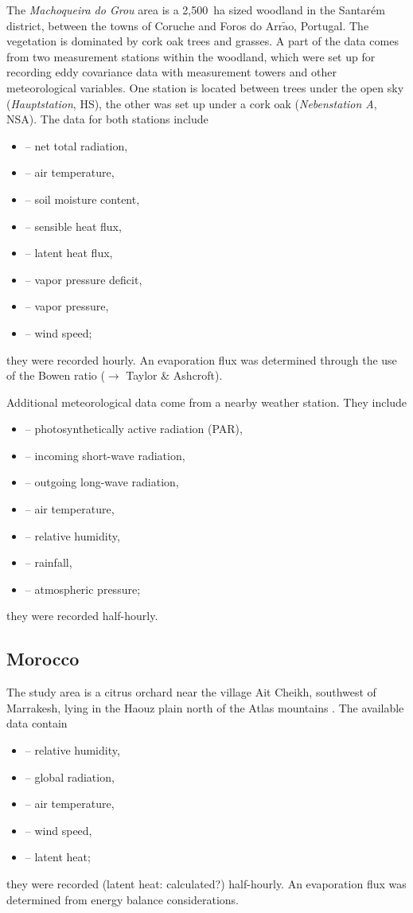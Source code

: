 \documentclass{scrreprt}
\newenvironment{denseitem}{
  \begin{itemize}
    \setlength{\itemsep}{0pt}
    \setlength{\parskip}{0pt}
    \setlength{\parsep}{0pt}
}{
  \end{itemize}
}
\begin{document}
The \emph{Machoqueira do Grou} area is a 2,500~ha sized woodland in the Santar\'em district, between the towns of Coruche and Foros do Arr$\tilde{\text{a}}$o, Portugal.
The vegetation is dominated by cork oak trees and grasses.
A part of the data comes from two measurement stations within the woodland, which were set up for recording eddy covariance data with measurement towers and other meteorological variables.
One station is located between trees under the open sky (\emph{Hauptstation}, HS), the other was set up under a cork oak (\emph{Nebenstation A}, NSA).
The data for both stations include
\begin{denseitem}
  \item[--] net total radiation,
  \item[--] air temperature,
  \item[--] soil moisture content,
  \item[--] sensible heat flux,
  \item[--] latent heat flux,
  \item[--] vapor pressure deficit,
  \item[--] vapor pressure,
  \item[--] wind speed;
\end{denseitem}
%
they were recorded hourly.
An evaporation flux was determined through the use of the Bowen ratio ($\rightarrow$ Taylor \& Ashcroft).

Additional meteorological data come from a nearby weather station.
They include
\begin{denseitem}
  \item[--] photosynthetically active radiation (PAR),
  \item[--] incoming short-wave radiation,
  \item[--] outgoing long-wave radiation,
  \item[--] air temperature,
  \item[--] relative humidity,
  \item[--] rainfall,
  \item[--] atmospheric pressure;
\end{denseitem}
%
they were recorded half-hourly.

\subsection{Morocco} \label{ssec:intro_areas_morocco}

The study area is a citrus orchard near the village Ait Cheikh, southwest of Marrakesh, lying in the Haouz plain north of the Atlas mountains \citep{mroos14}.
The available data contain
\begin{denseitem}
  \item[--] relative humidity,
  \item[--] global radiation,
  \item[--] air temperature,
  \item[--] wind speed,
  \item[--] latent heat;
\end{denseitem}
%
they were recorded (latent heat: calculated?) half-hourly.
An evaporation flux was determined from energy balance considerations.
\end{document}
